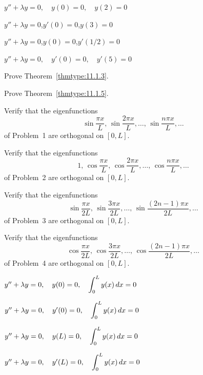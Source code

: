\begin{exerciselist}
  \item\label{exer:11.1.13} $y''+\lambda y=0,\quad y(0)=0,\quad y(2)=0$

  \item\label{exer:11.1.14} $y''+\lambda y=0$,\quad $y'(0)=0$,\quad $y(3)=0$

  \item\label{exer:11.1.15} $y''+\lambda y=0$,\quad $y(0)=0$,\quad $y'(1/2)=0$

  \item\label{exer:11.1.16} $y''+\lambda y=0,\quad y'(0)=0,\quad y'(5)=0$

  \item\label{exer:11.1.17} Prove Theorem~\ref{thmtype:11.1.3}.

  \item\label{exer:11.1.18} Prove Theorem~\ref{thmtype:11.1.5}.

  \item\label{exer:11.1.19} Verify that the eigenfunctions
  \[
    \sin\frac{\pi x}{L}, \,\sin\frac{2\pi x}{L},\dots, \,\sin\frac{n\pi x}{L},\dots
  \]
  of Problem~1 are orthogonal on $[0,L]$.

  \item\label{exer:11.1.20} Verify that the eigenfunctions
  \[
    1,\,\cos\frac{\pi x}{L}, \,\cos\frac{2\pi x}{L},\dots, \,\cos\frac{n\pi x}{L},\dots
  \]
  of Problem~2 are orthogonal on $[0,L]$.

  \item\label{exer:11.1.21} Verify that the eigenfunctions
  \[
    \sin\frac{\pi x}{2L}, \,\sin\frac{3\pi x}{2L},\dots, \,\sin\frac{(2n-1)\pi x}{2L},\dots
  \]
  of Problem~3 are orthogonal on $[0,L]$.

  \item\label{exer:11.1.22} Verify that the eigenfunctions
  \[
    \cos\frac{\pi x}{2L}, \,\cos\frac{3\pi x}{2L},\dots, \,\cos\frac{(2n-1)\pi x}{2L},\dots
  \]
  of Problem~4 are orthogonal on $[0,L]$.


  \item\label{exer:11.1.23} $y''+\lambda y=0,\quad y(0)=0,\quad\displaystyle\int_{0}^{L}y(x)\,dx=0$

  \item\label{exer:11.1.24} $y''+\lambda y=0,\quad y'(0)=0,\quad\displaystyle\int_{0}^{L}y(x)\,dx=0$

  \item\label{exer:11.1.25} $y''+\lambda y=0,\quad y(L)=0,\quad\displaystyle\int_{0}^{L}y(x)\,dx=0$

  \item\label{exer:11.1.26} $y''+\lambda y=0,\quad y'(L)=0,\quad\displaystyle\int_{0}^{L}y(x)\,dx=0$
\end{exerciselist}
